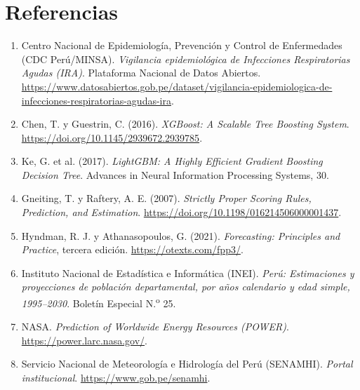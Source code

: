 \documentclass[10pt,a4paper]{article}
\begin{document}
\section{Referencias}
\begin{enumerate}[label={\arabic*.}]
\item Centro Nacional de Epidemiología, Prevención y Control de Enfermedades (CDC Perú/MINSA). \textit{Vigilancia epidemiológica de Infecciones Respiratorias Agudas (IRA)}. Plataforma Nacional de Datos Abiertos. \url{https://www.datosabiertos.gob.pe/dataset/vigilancia-epidemiologica-de-infecciones-respiratorias-agudas-ira}.
\item Chen, T. y Guestrin, C. (2016). \textit{XGBoost: A Scalable Tree Boosting System}. \url{https://doi.org/10.1145/2939672.2939785}.
\item Ke, G. et al. (2017). \textit{LightGBM: A Highly Efficient Gradient Boosting Decision Tree}. Advances in Neural Information Processing Systems, 30.
\item Gneiting, T. y Raftery, A. E. (2007). \textit{Strictly Proper Scoring Rules, Prediction, and Estimation}. \url{https://doi.org/10.1198/016214506000001437}.
\item Hyndman, R. J. y Athanasopoulos, G. (2021). \textit{Forecasting: Principles and Practice}, tercera edición. \url{https://otexts.com/fpp3/}.
\item Instituto Nacional de Estadística e Informática (INEI). \textit{Perú: Estimaciones y proyecciones de población departamental, por años calendario y edad simple, 1995--2030}. Boletín Especial N.\textsuperscript{o} 25.
\item NASA. \textit{Prediction of Worldwide Energy Resources (POWER)}. \url{https://power.larc.nasa.gov/}.
\item Servicio Nacional de Meteorología e Hidrología del Perú (SENAMHI). \textit{Portal institucional}. \url{https://www.gob.pe/senamhi}.
\end{enumerate}
\end{document}
